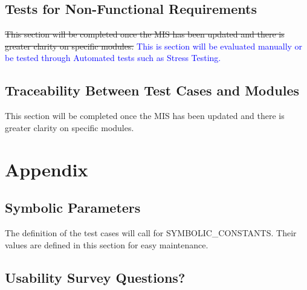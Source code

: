 \documentclass[12pt, titlepage]{article}
\begin{document}
\subsection{Tests for Non-Functional Requirements}

\sout{This section will be completed once the MIS has been updated and there is greater clarity on specific modules. }
\textcolor{blue}{
This is section will be evaluated manually or be tested through Automated tests such as Stress Testing.
}

\subsection{Traceability Between Test Cases and Modules}
This section will be completed once the MIS has been updated and there is greater clarity on specific modules.


				




\newpage

\section{Appendix}

\subsection{Symbolic Parameters}

The definition of the test cases will call for SYMBOLIC\_CONSTANTS.
Their values are defined in this section for easy maintenance.

\subsection{Usability Survey Questions?}
\end{document}
